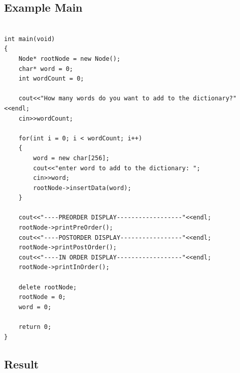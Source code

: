 \documentclass{article}
\begin{document}
	
	\subsection{Example Main}
	
		\begin{lstlisting}[label=Node-main, caption=Node Example Main]
	
int main(void)
{
    Node* rootNode = new Node();
    char* word = 0;
    int wordCount = 0;

    cout<<"How many words do you want to add to the dictionary?"<<endl;
    cin>>wordCount;

    for(int i = 0; i < wordCount; i++)
    {
        word = new char[256];
        cout<<"enter word to add to the dictionary: ";
        cin>>word;
        rootNode->insertData(word);
    }

    cout<<"----PREORDER DISPLAY------------------"<<endl;
    rootNode->printPreOrder();
    cout<<"----POSTORDER DISPLAY-----------------"<<endl;
    rootNode->printPostOrder();
    cout<<"----IN ORDER DISPLAY------------------"<<endl;
    rootNode->printInOrder();
    
    delete rootNode;
    rootNode = 0;
    word = 0;
    
    return 0;
}
	\end{lstlisting}
	
	\subsection{Result}
	
\end{document}
